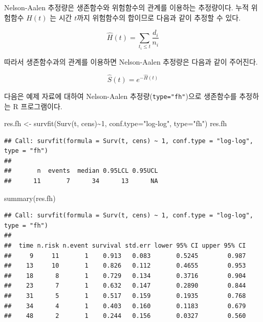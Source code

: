 \documentclass[
]{book}
\newenvironment{Shaded}{\begin{snugshade}}{\end{snugshade}}
\newcommand{\AttributeTok}[1]{\textcolor[rgb]{0.77,0.63,0.00}{#1}}
\newcommand{\DecValTok}[1]{\textcolor[rgb]{0.00,0.00,0.81}{#1}}
\newcommand{\FunctionTok}[1]{\textcolor[rgb]{0.00,0.00,0.00}{#1}}
\newcommand{\NormalTok}[1]{#1}
\newcommand{\OtherTok}[1]{\textcolor[rgb]{0.56,0.35,0.01}{#1}}
\newcommand{\SpecialCharTok}[1]{\textcolor[rgb]{0.00,0.00,0.00}{#1}}
\newcommand{\StringTok}[1]{\textcolor[rgb]{0.31,0.60,0.02}{#1}}
\theoremstyle{definition}
\theoremstyle{definition}
\theoremstyle{definition}
\theoremstyle{definition}
\theoremstyle{remark}
\begin{document}
Nelson-Aalen 추정량은 생존함수와 위험함수의 관계를 이용하는 추정량이다.
누적 위험함수 \(H(t)\) 는 시간 \(t\)까지 위험함수의 합이므로 다음과 같이 추정할 수 있다.

\[  \hat H(t) = \sum_{t_i \le t} \frac{d_i}{n_i} \]

따라서 생존함수과의 관계를 이용하면 Nelson-Aalen 추정량은 다음과 같이 주어진다.

\[ \hat S(t) = e^{- \hat H(t)} \]

다음은 예제 자료에 대하여 Nelson-Aalen 추정량(\texttt{type="fh"})으로 생존함수를 추정하는 R 프로그램이다.

\begin{Shaded}
\begin{Highlighting}[]
\NormalTok{res.fh }\OtherTok{\textless{}{-}} \FunctionTok{survfit}\NormalTok{(}\FunctionTok{Surv}\NormalTok{(t, cens)}\SpecialCharTok{\textasciitilde{}}\DecValTok{1}\NormalTok{,  }\AttributeTok{conf.type=}\StringTok{"log{-}log"}\NormalTok{, }\AttributeTok{type=}\StringTok{"fh"}\NormalTok{)}
\NormalTok{res.fh}
\end{Highlighting}
\end{Shaded}

\begin{verbatim}
## Call: survfit(formula = Surv(t, cens) ~ 1, conf.type = "log-log", type = "fh")
## 
##       n  events  median 0.95LCL 0.95UCL 
##      11       7      34      13      NA
\end{verbatim}

\begin{Shaded}
\begin{Highlighting}[]
\FunctionTok{summary}\NormalTok{(res.fh)}
\end{Highlighting}
\end{Shaded}

\begin{verbatim}
## Call: survfit(formula = Surv(t, cens) ~ 1, conf.type = "log-log", type = "fh")
## 
##  time n.risk n.event survival std.err lower 95% CI upper 95% CI
##     9     11       1    0.913   0.083       0.5245        0.987
##    13     10       1    0.826   0.112       0.4655        0.953
##    18      8       1    0.729   0.134       0.3716        0.904
##    23      7       1    0.632   0.147       0.2890        0.844
##    31      5       1    0.517   0.159       0.1935        0.768
##    34      4       1    0.403   0.160       0.1183        0.679
##    48      2       1    0.244   0.156       0.0327        0.560
\end{verbatim}
\end{document}
